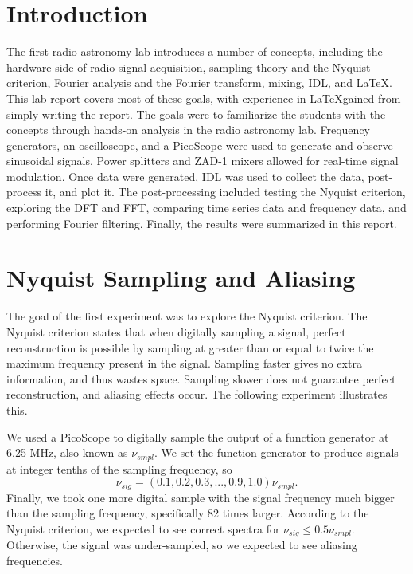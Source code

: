 \documentclass[12pt]{article}
\begin{document}
\maketitle

\section{Introduction}
The first radio astronomy lab introduces a number of concepts, including the hardware side of radio signal acquisition, sampling theory and the Nyquist criterion, Fourier analysis and the Fourier transform, mixing, IDL, and \LaTeX.
This lab report covers most of these goals, with experience in \LaTeX gained from simply writing the report.
The goals were to familiarize the students with the concepts through hands-on analysis in the radio astronomy lab.
Frequency generators, an oscilloscope, and a PicoScope were used to generate and observe sinusoidal signals.
Power splitters and ZAD-1 mixers allowed for real-time signal modulation.
Once data were generated, IDL was used to collect the data, post-process it, and plot it.
The post-processing included testing the Nyquist criterion, exploring the DFT and FFT, comparing time series data and frequency data, and performing Fourier filtering.
Finally, the results were summarized in this report. 



\section{Nyquist Sampling and Aliasing}
The goal of the first experiment was to explore the Nyquist criterion.
The Nyquist criterion states that when digitally sampling a signal, perfect reconstruction is possible by sampling at greater than or equal to twice the maximum frequency present in the signal.
Sampling faster gives no extra information, and thus wastes space.
Sampling slower does not guarantee perfect reconstruction, and aliasing effects occur.
The following experiment illustrates this.

We used a PicoScope to digitally sample the output of a function generator at 6.25 MHz, also known as $\nu_{smpl}$.
We set the function generator to produce signals at integer tenths of the sampling frequency, so 
\begin{equation}
\nu_{sig} = (0.1, 0.2, 0.3, ..., 0.9, 1.0)\nu_{smpl}.
\end{equation}
Finally, we took one more digital sample with the signal frequency much bigger than the sampling frequency, specifically 82 times larger.
According to the Nyquist criterion, we expected to see correct spectra for $\nu_{sig} \leq 0.5\nu_{smpl}$.
Otherwise, the signal was under-sampled, so we expected to see aliasing frequencies.
\end{document}
